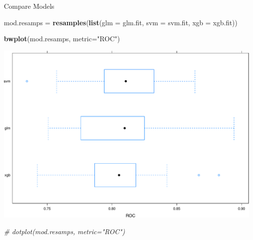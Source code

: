 \documentclass[ignorenonframetext,]{beamer}
\newenvironment{Shaded}{\begin{snugshade}}{\end{snugshade}}
\newcommand{\KeywordTok}[1]{\textcolor[rgb]{0.13,0.29,0.53}{\textbf{#1}}}
\newcommand{\DataTypeTok}[1]{\textcolor[rgb]{0.13,0.29,0.53}{#1}}
\newcommand{\StringTok}[1]{\textcolor[rgb]{0.31,0.60,0.02}{#1}}
\newcommand{\CommentTok}[1]{\textcolor[rgb]{0.56,0.35,0.01}{\textit{#1}}}
\newcommand{\NormalTok}[1]{#1}
\begin{document}
\begin{frame}[fragile]{Compare Models}

\begin{Shaded}
\begin{Highlighting}[]
\NormalTok{mod.resamps =}\StringTok{ }\KeywordTok{resamples}\NormalTok{(}\KeywordTok{list}\NormalTok{(}\DataTypeTok{glm =}\NormalTok{ glm.fit, }\DataTypeTok{svm =}\NormalTok{ svm.fit, }\DataTypeTok{xgb =}\NormalTok{ xgb.fit))}

\KeywordTok{bwplot}\NormalTok{(mod.resamps, }\DataTypeTok{metric=}\StringTok{"ROC"}\NormalTok{)}
\end{Highlighting}
\end{Shaded}

\includegraphics{ML_with_caret_files/figure-beamer/compare_boxplot-1.pdf}

\begin{Shaded}
\begin{Highlighting}[]
\CommentTok{# dotplot(mod.resamps, metric="ROC")}
\end{Highlighting}
\end{Shaded}

\end{frame}
\end{document}
